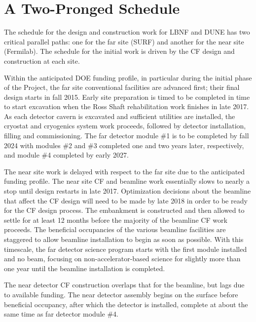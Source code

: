 \section{A Two-Pronged Schedule} %

The schedule for the design and construction work for LBNF and DUNE has two critical parallel paths: one for the %
far site (SURF) and %
another for the %
near site (Fermilab). The schedule for the initial work is driven by the CF design and construction at each site. 

Within the anticipated DOE funding profile, in particular during the initial phase of the Project, the far site conventional
facilities are advanced first; their final design starts in fall 2015. Early site preparation is timed to be completed %
in time to start excavation when the Ross Shaft rehabilitation work finishes %
 in late 2017. As each detector %
 cavern is excavated and sufficient utilities are installed, the cryostat and cryogenics system work proceeds, followed by detector installation, filling and commissioning. 
 The far detector module \#1 is to be completed by fall 2024 with modules \#2 and \#3 completed
 one and two years later, respectively, and module \#4 completed by early 2027.

The near site work is delayed with respect to the far site due to the anticipated funding profile. The near site CF and beamline work essentially slows to nearly a stop %
until design restarts in late 2017. Optimization decisions about the beamline that affect the CF design will need to be made by late 2018 in order to be ready for the CF design process. The embankment is constructed and then allowed to settle for at least 12 months before the majority of the beamline CF work proceeds. The beneficial occupancies of the various beamline facilities %
are staggered to allow beamline installation to begin as soon as possible. With this timescale, the far detector science program %
starts with the first module installed and no beam, focusing on non-accelerator-based science %
for slightly more than one year until 
the beamline installation is completed.


The near detector CF construction overlaps that for the beamline, but lags due to available funding. The near detector assembly begins on the surface before beneficial occupancy, after which the detector is installed, complete at about the same time as far detector module \#4. 

